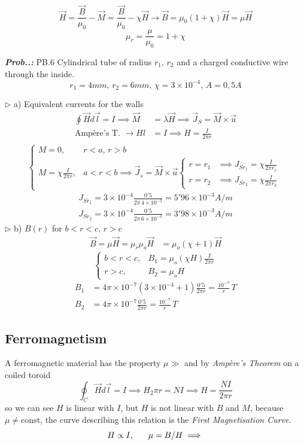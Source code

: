 \documentclass[a4paper]{article}
\begin{document}
$$
\vec{H}=\frac{\vec{B}}{\mu_{0}}-\vec{M}=\frac{\vec{B}}{\mu_{0}}-\chi \vec{H} \to \vec{B}=\mu_{0}(1+\chi)\vec{H}=\mu \vec{H}
$$
$$
\mu_{r}=\frac{\mu}{\mu_{0}}=1+\chi
$$

\vspace{2ex}\textbf{\textit{Prob.\thesection.\theprob: }}PB.6 Cylindrical tube of radius $r_{1},\,r_{2}$ and a charged conductive wire through the inside.
$$r_{1}=4mm,\,r_{2}=6mm,\,\chi=3\times 10^{-4},\,A=0,5A$$

$\triangleright$ a) Equivalent currents for the walls
\begin{align}
\oint\vec{H}d\vec{l}=I\implies \vec{M}&=\lambda \vec{H}\implies \vec{J}_{S}=\vec{M}\times \vec{u} \\
\text{Ampère's T. }\to Hl&=I\implies H =\frac{I}{2\pi r} \\
\end{align}
$$
\begin{cases}
M=0, & r<a,\,r>b \\
M=\chi \frac{I}{2\pi r}, & a<r<b\implies\vec{J}_{s}=\vec{M}\times \vec{u}\begin{cases}
r=r_{1}&\implies J_{Sr_{1}}=\chi \frac{I}{2\pi r_{1}} \\
r=r_{2}&\implies J_{Sr_{2}}=\chi \frac{I}{2\pi r_{2}}
\end{cases}
\end{cases}
$$
\begin{align}
J_{Sr_{1}}=3\times 10^{-4} \frac{0'5}{2\pi\, 4\times 10^{-3}}=\boxed{5'96\times 10^{-3}A / m} \\
J_{Sr_{2}} = 3\times 10^{-4} \frac{0'5}{2\pi\,6\times 10^{-3}}=\boxed{3'98 \times 10^{-3} A / m}
\end{align}
$\triangleright$ b) $B(r)$ for $b<r<c,\,r>c$
\begin{align}
\vec{B}=\mu \vec{H}=\mu _{r}\mu_{o}\vec{H} & =\mu_{o}(\chi+1)\vec{H}
\end{align}
$$
\begin{cases}
b<r<c,&B_{1}=\mu_{o}(\chi H) \frac{I}{2\pi r} \\
r>c,&B_{2}=\mu_{o}H
\end{cases}
$$
\begin{align}
B_{1}&=4\pi \times 10^{-7}(3\times 10^{-4}+1) \frac{0'5}{2\pi r}=\boxed{\frac{10^{-7}}{r}\,T} \\
B_{2}&=4\pi \times 10^{-7} \frac{0'5}{2\pi r}=\boxed{\frac{10^{-7}}{r}\,T}
\end{align}
\subsection{Ferromagnetism}
\setcounter{equation}{0}
A ferromagnetic material has the property $\mu\gg$ and by \textit{Ampère's Theorem} on a coiled toroid
$$
\oint_{C}\vec{H}d\vec{l}=I\implies H_{2}\pi r=NI\implies \boxed{H=\frac{NI}{2\pi r}}
$$
so we can see $H$ is linear with $I$, but $H$ is not linear with $B$ and $M$, because $\mu \neq \text{const}$, the curve describing this relation is the \textit{First Magnetisation Curve}.
$$
H\propto I,\hspace{4ex}\mu=B / H\implies 
$$
\end{document}
